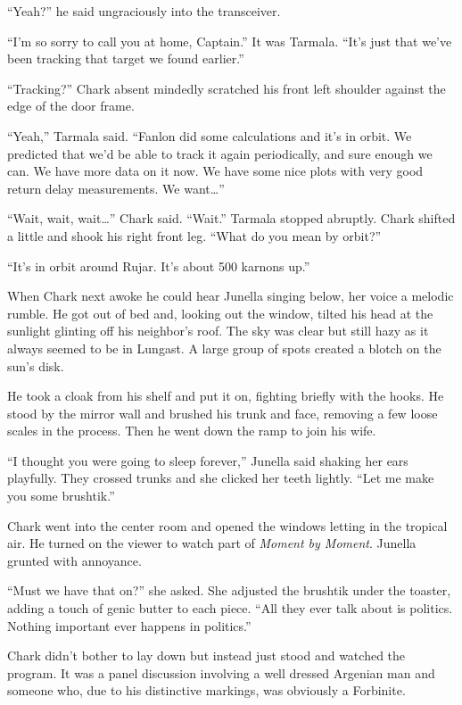``Yeah?'' he said ungraciously into the transceiver.

``I'm so sorry to call you at home, Captain.'' It was Tarmala. ``It's just that we've been
tracking that target we found earlier.''

``Tracking?'' Chark absent mindedly scratched his front left shoulder against the edge of the
door frame.

``Yeah,'' Tarmala said. ``Fanlon did some calculations and it's in orbit. We predicted that we'd
be able to track it again periodically, and sure enough we can. We have more data on it now. We
have some nice plots with very good return delay measurements. We want\ldots''

``Wait, wait, wait\ldots'' Chark said. ``Wait.'' Tarmala stopped abruptly. Chark shifted a
little and shook his right front leg. ``What do you mean by orbit?''

``It's in orbit around Rujar. It's about 500 karnons up.''

\spacebreak

When Chark next awoke he could hear Junella singing below, her voice a melodic rumble. He got
out of bed and, looking out the window, tilted his head at the sunlight glinting off his
neighbor's roof. The sky was clear but still hazy as it always seemed to be in Lungast. A large
group of spots created a blotch on the sun's disk.

He took a cloak from his shelf and put it on, fighting briefly with the hooks. He stood by the
mirror wall and brushed his trunk and face, removing a few loose scales in the process. Then he
went down the ramp to join his wife.

``I thought you were going to sleep forever,'' Junella said shaking her ears playfully. They
crossed trunks and she clicked her teeth lightly. ``Let me make you some brushtik.''

Chark went into the center room and opened the windows letting in the tropical air. He turned on
the viewer to watch part of \textit{Moment by Moment}. Junella grunted with annoyance.

``Must we have that on?'' she asked. She adjusted the brushtik under the toaster, adding a touch
of genic butter to each piece. ``All they ever talk about is politics. Nothing important ever
happens in politics.''

Chark didn't bother to lay down but instead just stood and watched the program. It was a panel
discussion involving a well dressed Argenian man and someone who, due to his distinctive
markings, was obviously a Forbinite.

